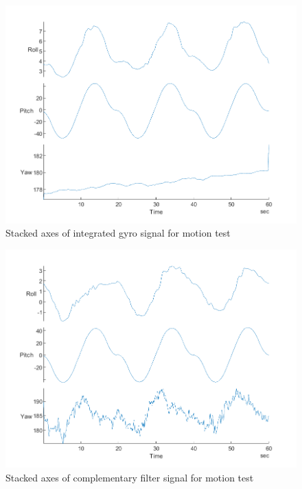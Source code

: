 \begin{figure}[H]
    \centering
    \includegraphics[scale=1]{graphics/Navigation/StackedMotionGyro.png}
    \caption{Stacked axes of integrated gyro signal for motion test}
     \label{fig:Stacked axes of integrated gyro signal for motion test}
\end{figure}

\begin{figure}[H]
    \centering
    \includegraphics[scale=1]{graphics/Navigation/StackedMotionComp.png}
    \caption{Stacked axes of complementary filter signal for motion test}
     \label{fig:Stacked axes of complementary filter signal for motion test}
\end{figure}

